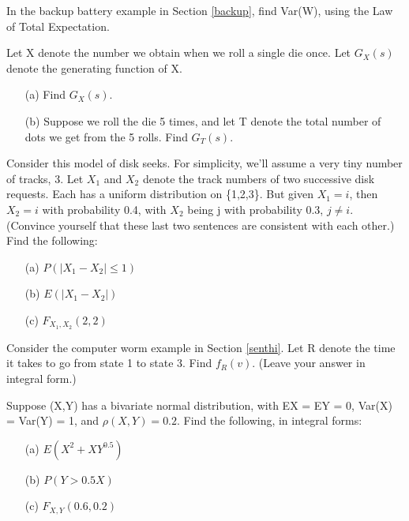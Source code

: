 \oneproblem
In the backup battery example in Section \ref{backup}, find Var(W),
using the Law of Total Expectation.

\oneproblem
Let X denote the number we obtain when we roll a single die
once.  Let $G_X(s)$ denote the generating function of X.

\begin{itemize}

\item [(a)] Find $G_X(s)$.

\item [(b)] Suppose we roll the die 5 times, and let T denote the
total number of dots we get from the 5 rolls.  Find $G_T(s)$.

\end{itemize}

\oneproblem
Consider this model of disk seeks. For simplicity, we'll assume a very
tiny number of tracks, 3. Let $X_1$ and $X_2$ denote the track numbers
of two successive disk requests. Each has a uniform distribution on
\{1,2,3\}. But given $X_1 = i$, then $X_2 = i$ with probability 0.4, with
$X_2$ being j with probability 0.3, $j \neq i$. (Convince yourself that
these last two sentences are consistent with each other.) Find the
following:

\begin{itemize}

\item [(a)] $P(|X_1 - X_2| \leq 1)$

\item [(b)] $E(|X_1 - X_2|)$

\item [(c)] $F_{X_1,X_2}(2,2)$

\end{itemize}

\oneproblem
Consider the computer worm example in Section \ref{senthi}.  Let R
denote the time it takes to go from state 1 to state 3.  Find $f_R(v)$.  
(Leave your answer in integral form.)

\oneproblem
Suppose (X,Y) has a bivariate normal distribution, with EX = EY = 0,
Var(X) = Var(Y) = 1, and $\rho(X,Y) = 0.2$.  Find the following, in
integral forms:

\begin{itemize}

\item [(a)] $E(X^2+XY^{0.5})$

\item [(b)] $P(Y > 0.5X)$

\item [(c)] $F_{X,Y}(0.6,0.2)$

\end{itemize}
                      
